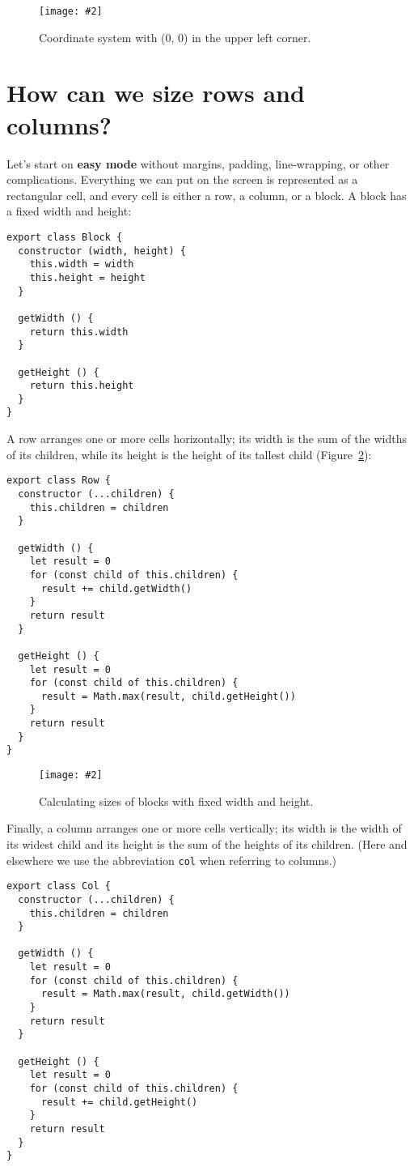 \documentclass[krantzl]{krantz}
\newcommand{\figpdf}[4]{\begin{figure}%
\centering%
\texttt{[image: \#2]}%
\caption{#3}%
\label{#1}%
\end{figure}}
\newcommand{\figref}[1]{Figure~\ref{#1}}
\newcommand{\glossref}[1]{\textbf{#1}}
\begin{document}
\figpdf{layout-engine-coordinate-system}{./layout-engine/coordinate-system.pdf}{Coordinate system with (0, 0) in the upper left corner.}{0.6}

\section{How can we size rows and columns?}\label{layout-engine-size}


Let’s start on \glossref{easy mode}
without margins, padding, line-wrapping, or other complications.
Everything we can put on the screen is represented as a rectangular cell,
and every cell is either a row, a column, or a block.
A block has a fixed width and height:


\begin{lstlisting}[frame=tblr]
export class Block {
  constructor (width, height) {
    this.width = width
    this.height = height
  }

  getWidth () {
    return this.width
  }

  getHeight () {
    return this.height
  }
}
\end{lstlisting}



A row arranges one or more cells horizontally;
its width is the sum of the widths of its children,
while its height is the height of its tallest child
(\figref{layout-engine-sizing}):


\begin{lstlisting}[frame=tblr]
export class Row {
  constructor (...children) {
    this.children = children
  }

  getWidth () {
    let result = 0
    for (const child of this.children) {
      result += child.getWidth()
    }
    return result
  }

  getHeight () {
    let result = 0
    for (const child of this.children) {
      result = Math.max(result, child.getHeight())
    }
    return result
  }
}
\end{lstlisting}


\figpdf{layout-engine-sizing}{./layout-engine/sizing.pdf}{Calculating sizes of blocks with fixed width and height.}{0.6}


Finally,
a column arranges one or more cells vertically;
its width is the width of its widest child
and its height is the sum of the heights of its children.
(Here and elsewhere we use the abbreviation \texttt{col} when referring to columns.)


\begin{lstlisting}[frame=tblr]
export class Col {
  constructor (...children) {
    this.children = children
  }

  getWidth () {
    let result = 0
    for (const child of this.children) {
      result = Math.max(result, child.getWidth())
    }
    return result
  }

  getHeight () {
    let result = 0
    for (const child of this.children) {
      result += child.getHeight()
    }
    return result
  }
}
\end{lstlisting}
\end{document}
